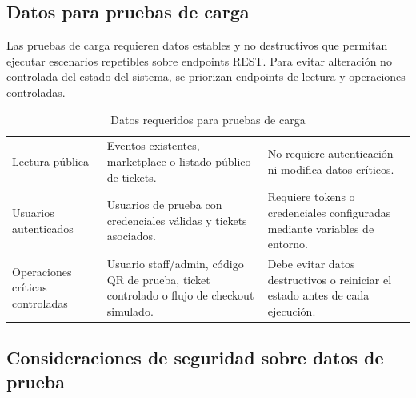 \documentclass[12pt,letterpaper]{article}
\begin{document}
\subsection{Datos para pruebas de carga}

Las pruebas de carga requieren datos estables y no destructivos que permitan ejecutar escenarios repetibles sobre endpoints REST. Para evitar alteración no controlada del estado del sistema, se priorizan endpoints de lectura y operaciones controladas.

\begin{table}[H]
\centering

\begingroup
\scriptsize
\setlength{\tabcolsep}{3pt}
\renewcommand{\arraystretch}{1.22}

\begin{tabularx}{\textwidth}{|
>{\raggedright\arraybackslash}p{3.6cm}|
>{\raggedright\arraybackslash}X|
>{\raggedright\arraybackslash}p{4.4cm}|}
\hline
\multicolumn{1}{|>{\centering\arraybackslash}m{3.6cm}|}{\textbf{Escenario}} &
\multicolumn{1}{>{\centering\arraybackslash}m{6.4cm}|}{\textbf{Datos requeridos}} &
\multicolumn{1}{>{\centering\arraybackslash}m{4.4cm}|}{\textbf{Observaciones}} \\
\hline

Lectura pública &
Eventos existentes, marketplace o listado público de tickets. &
No requiere autenticación ni modifica datos críticos. \\
\hline

Usuarios autenticados &
Usuarios de prueba con credenciales válidas y tickets asociados. &
Requiere tokens o credenciales configuradas mediante variables de entorno. \\
\hline

Operaciones críticas controladas &
Usuario staff/admin, código QR de prueba, ticket controlado o flujo de checkout simulado. &
Debe evitar datos destructivos o reiniciar el estado antes de cada ejecución. \\
\hline

\end{tabularx}

\endgroup

\caption{Datos requeridos para pruebas de carga}
\label{tab:datos-pruebas-carga}
\end{table}

\subsection{Consideraciones de seguridad sobre datos de prueba}
\end{document}
